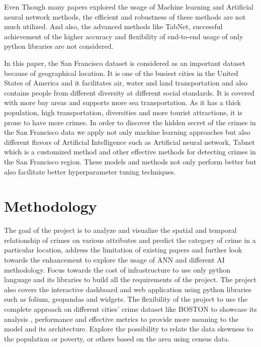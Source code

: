 \documentclass[conference,final,]{IEEEtran}
\begin{document}
Even Though many papers explored the usage of Machine learning and Artificial
neural network methods, the efficient and robustness of these methods are not 
much utilized. And also, the advanced methods like TabNet, successful 
achievement of the higher accuracy and flexibility of end-to-end usage of 
only python libraries are not considered.

In this paper, the San Francisco dataset is considered as an important
dataset because of geographical location. It is one of the busiest
cities in the United States of America and it facilitates air, water and
land transportation and also contains people from different diversity at
different social standards. It is covered with more bay areas and
supports more sea transportation. As it has a thick population, high
transportation, diversities and more tourist attractions, it is prone to
have more crimes. In order to discover the hidden secret of the crimes
in the San Francisco data we apply not only machine learning approaches
but also different flavors of Artificial Intelligence such as Artificial
neural network, Tabnet which is a customized method and other effective
methods for detecting crimes in the San Francisco region. These models
and methods not only perform better but also facilitate better
hyperparameter tuning techniques.

\section{Methodology}\label{methodology}

The goal of the project is to analyze and visualize the spatial and
temporal relationship of crimes on various attributes and predict the
category of crime in a particular location, address the limitation of
existing papers and further look towards the enhancement to explore the
usage of ANN and different AI methodology. Focus towards the cost of
infrastructure to use only python language and its libraries to build
all the requirements of the project. The project also covers the
interactive dashboard and web application using python libraries such as
folium, geopandas and widgets. The flexibility of the project to use the
complete approach on different cities' crime dataset like BOSTON to
showcase its analysis , performance and effective metrics to provide
more meaning to the model and its architecture. Explore the possibility
to relate the data skewness to the population or poverty, or others
based on the area using census data.
\end{document}
